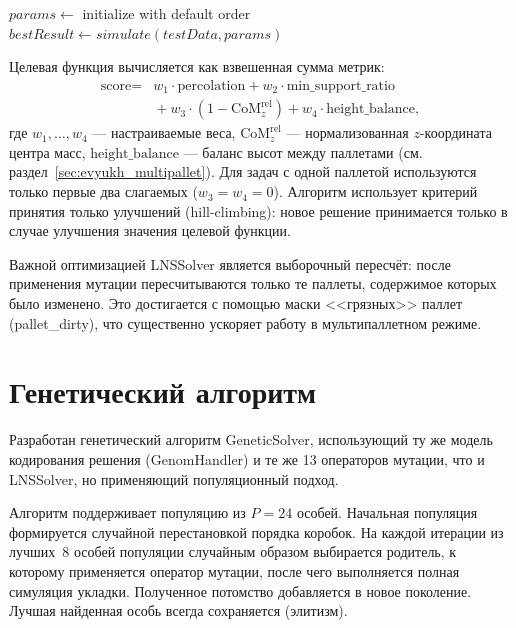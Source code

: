\begin{algorithm}[H]
\caption{Алгоритм поиска в большой окрестности (LNSSolver)}
\label{alg:evyukh_lns}
$params \leftarrow$ initialize with default order\;
$bestResult \leftarrow simulate(testData, params)$\;
\end{algorithm}

Целевая функция вычисляется как взвешенная сумма метрик:
\[
\begin{split}
\text{score} = {}& w_1 \cdot \text{percolation}
    + w_2 \cdot \text{min\_support\_ratio} \\
&{}+ w_3 \cdot (1 - \text{CoM}_z^{\text{rel}})
    + w_4 \cdot \text{height\_balance},
\end{split}
\]
где $w_1, \ldots, w_4$ --- настраиваемые веса, $\text{CoM}_z^{\text{rel}}$ --- нормализованная $z$-координата центра масс, $\text{height\_balance}$ --- баланс высот между паллетами (см. раздел~\ref{sec:evyukh_multipallet}). Для задач с одной паллетой используются только первые два слагаемых ($w_3 = w_4 = 0$). Алгоритм использует критерий принятия только улучшений (hill-climbing): новое решение принимается только в случае улучшения значения целевой функции.

Важной оптимизацией LNSSolver является выборочный пересчёт: после применения мутации пересчитываются только те паллеты, содержимое которых было изменено. Это достигается с помощью маски <<грязных>> паллет (pallet\_dirty), что существенно ускоряет работу в мультипаллетном режиме.

\section{Генетический алгоритм}

Разработан генетический алгоритм GeneticSolver, использующий ту же модель кодирования решения (GenomHandler) и те же 13 операторов мутации, что и LNSSolver, но применяющий популяционный подход.

Алгоритм поддерживает популяцию из $P = 24$ особей. Начальная популяция формируется случайной перестановкой порядка коробок. На каждой итерации из лучших~8 особей популяции случайным образом выбирается родитель, к которому применяется оператор мутации, после чего выполняется полная симуляция укладки. Полученное потомство добавляется в новое поколение. Лучшая найденная особь всегда сохраняется (элитизм).

